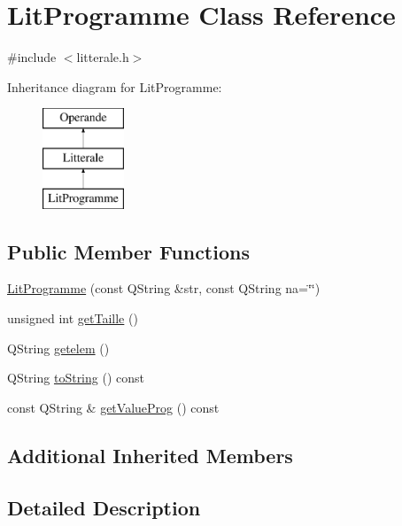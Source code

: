 \hypertarget{class_lit_programme}{}\section{Lit\+Programme Class Reference}
\label{class_lit_programme}


{\ttfamily \#include $<$litterale.\+h$>$}

Inheritance diagram for Lit\+Programme\+:\begin{figure}[H]
\begin{center}
\leavevmode
\includegraphics[height=3.000000cm]{class_lit_programme}
\end{center}
\end{figure}
\subsection*{Public Member Functions}
\begin{DoxyCompactItemize}
\item 
\hyperlink{class_lit_programme_aaafb933f7483a4a5020970c9c7e9469a}{Lit\+Programme} (const Q\+String \&str, const Q\+String na=\char`\"{}\char`\"{})
\item 
unsigned int \hyperlink{class_lit_programme_ab17a5bb2c1d595d262115055fef828bf}{get\+Taille} ()
\item 
Q\+String \hyperlink{class_lit_programme_aa95b51a0885edb825b5753d592af024f}{getelem} ()
\item 
Q\+String \hyperlink{class_lit_programme_a8a1086c6458e02378f66144fe1f841be}{to\+String} () const 
\item 
const Q\+String \& \hyperlink{class_lit_programme_a290d6872bcc72ed8c820d198038cb4af}{get\+Value\+Prog} () const 
\end{DoxyCompactItemize}
\subsection*{Additional Inherited Members}


\subsection{Detailed Description}


